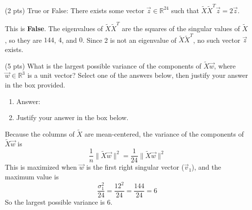 \documentclass[11pt]{article}
\begin{document}
\begin{prob}[(12 pts)]
\begin{subprob}(2 pts) True or False: There exists some vector $\vec z \in \mathbb{R}^{24}$ such that $\tilde X \tilde X^T \vec z = 2 \vec z$. \\

  
\begin{solution}
This is \textbf{False}. The eigenvalues of $\tilde X \tilde X^T$ are the squares of the singular values of $\tilde X$, so they are $144$, $4$, and $0$. Since 2 is not an eigenvalue of $\tilde X \tilde X^T$, no such vector $\vec z$ exists.
\end{solution}
\end{subprob}






\begin{subprob}(5 pts) What is the largest possible variance of the components of $\tilde X \vec w$, where $\vec w \in \mathbb{R}^3$ is a unit vector? Select one of the answers below, then justify your answer in the box provided.

\begin{enumerate}
    \item Answer: \: \:      
    \item Justify your answer in the box below. \\  \emptybox{4cm}{}
\end{enumerate}
\begin{solution}
Because the columns of $\tilde X$ are mean-centered, the variance of the components of $\tilde X\vec w$ is
\[
\frac{1}{n}\|\tilde X\vec w\|^2 = \frac{1}{24}\|\tilde X\vec w\|^2
\]
This is maximized when $\vec w$ is the first right singular vector ($\vec v_1$), and the maximum value is
\[
\frac{\sigma_1^2}{24} = \frac{12^2}{24} = \frac{144}{24} = 6
\]
So the largest possible variance is $\boxed{6}$.
\end{solution}

\end{subprob}



\end{prob}
\end{document}
